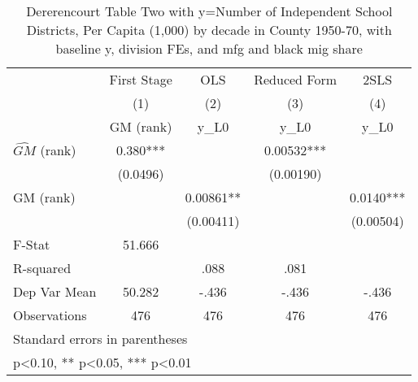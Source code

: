 \begin{table}[htbp]\centering
\def\sym#1{\ifmmode^{#1}\else\(^{#1}\)\fi}
\caption{Dererencourt Table Two with y=Number of Independent School Districts, Per Capita (1,000) by decade in County 1950-70, with baseline y, division FEs, and mfg and black mig share}
\begin{tabular}{l*{4}{c}}
\toprule
                    & First Stage   &         OLS   &Reduced Form   &        2SLS   \\
                    &\multicolumn{1}{c}{(1)}&\multicolumn{1}{c}{(2)}&\multicolumn{1}{c}{(3)}&\multicolumn{1}{c}{(4)}\\
                    &\multicolumn{1}{c}{GM  (rank)}&\multicolumn{1}{c}{y\_L0}&\multicolumn{1}{c}{y\_L0}&\multicolumn{1}{c}{y\_L0}\\
\midrule
$\hat{GM}$ (rank)   &       0.380***&               &     0.00532***&               \\
                    &    (0.0496)   &               &   (0.00190)   &               \\
\addlinespace
GM  (rank)          &               &     0.00861** &               &      0.0140***\\
                    &               &   (0.00411)   &               &   (0.00504)   \\
\midrule
F-Stat              &      51.666   &               &               &               \\
R-squared           &               &        .088   &        .081   &               \\
Dep Var Mean        &      50.282   &       -.436   &       -.436   &       -.436   \\
Observations        &         476   &         476   &         476   &         476   \\
\bottomrule
\multicolumn{5}{l}{\footnotesize Standard errors in parentheses}\\
\multicolumn{5}{l}{\footnotesize * p<0.10, ** p<0.05, *** p<0.01}\\
\end{tabular}
\end{table}

